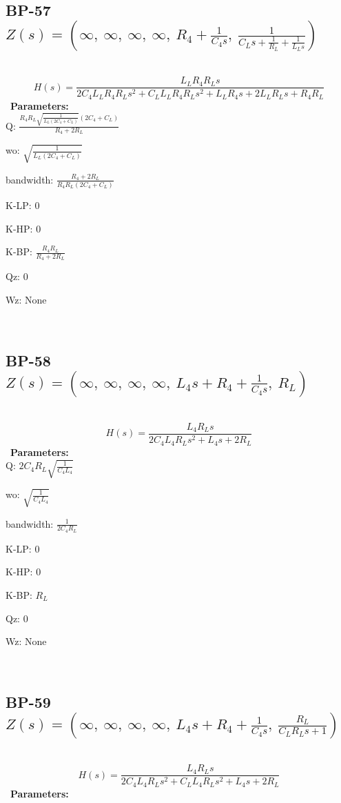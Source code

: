\documentclass{article}
\begin{document}
\ 

\subsection{BP-57 $Z(s) = \left( \infty, \  \infty, \  \infty, \  \infty, \  R_{4} + \frac{1}{C_{4} s}, \  \frac{1}{C_{L} s + \frac{1}{R_{L}} + \frac{1}{L_{L} s}}\right)$ } \ 
\textbf{\[H(s) = \frac{L_{L} R_{4} R_{L} s}{2 C_{4} L_{L} R_{4} R_{L} s^{2} + C_{L} L_{L} R_{4} R_{L} s^{2} + L_{L} R_{4} s + 2 L_{L} R_{L} s + R_{4} R_{L}}\] } \ 
\textbf{Parameters:}\\ 

Q: $\frac{R_{4} R_{L} \sqrt{\frac{1}{L_{L} \left(2 C_{4} + C_{L}\right)}} \left(2 C_{4} + C_{L}\right)}{R_{4} + 2 R_{L}}$\ 

wo: $\sqrt{\frac{1}{L_{L} \left(2 C_{4} + C_{L}\right)}}$\ 

bandwidth: $\frac{R_{4} + 2 R_{L}}{R_{4} R_{L} \left(2 C_{4} + C_{L}\right)}$\ 

K-LP: $0$\ 

K-HP: $0$\ 

K-BP: $\frac{R_{4} R_{L}}{R_{4} + 2 R_{L}}$\ 

Qz: $0$\ 

Wz: $\text{None}$\ 

\ 

\subsection{BP-58 $Z(s) = \left( \infty, \  \infty, \  \infty, \  \infty, \  L_{4} s + R_{4} + \frac{1}{C_{4} s}, \  R_{L}\right)$ } \ 
\textbf{\[H(s) = \frac{L_{4} R_{L} s}{2 C_{4} L_{4} R_{L} s^{2} + L_{4} s + 2 R_{L}}\] } \ 
\textbf{Parameters:}\\ 

Q: $2 C_{4} R_{L} \sqrt{\frac{1}{C_{4} L_{4}}}$\ 

wo: $\sqrt{\frac{1}{C_{4} L_{4}}}$\ 

bandwidth: $\frac{1}{2 C_{4} R_{L}}$\ 

K-LP: $0$\ 

K-HP: $0$\ 

K-BP: $R_{L}$\ 

Qz: $0$\ 

Wz: $\text{None}$\ 

\ 

\subsection{BP-59 $Z(s) = \left( \infty, \  \infty, \  \infty, \  \infty, \  L_{4} s + R_{4} + \frac{1}{C_{4} s}, \  \frac{R_{L}}{C_{L} R_{L} s + 1}\right)$ } \ 
\textbf{\[H(s) = \frac{L_{4} R_{L} s}{2 C_{4} L_{4} R_{L} s^{2} + C_{L} L_{4} R_{L} s^{2} + L_{4} s + 2 R_{L}}\] } \ 
\textbf{Parameters:}\\ 
\end{document}

